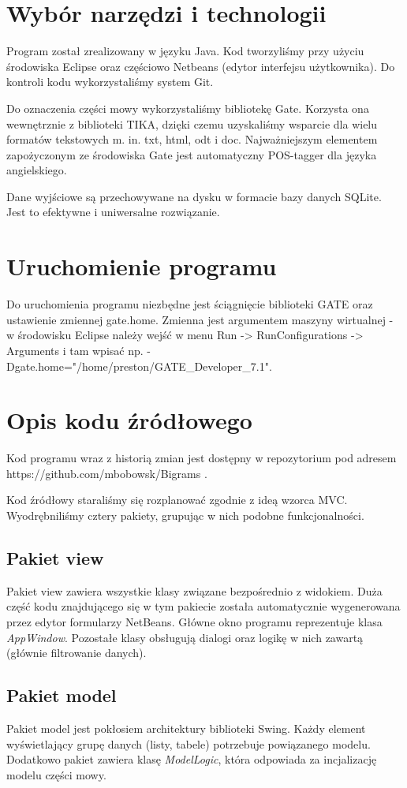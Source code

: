 \documentclass[11pt]{article}
\begin{document}
\section{Wybór narzędzi i technologii}
Program został zrealizowany w języku Java.
Kod tworzyliśmy przy użyciu środowiska Eclipse oraz częściowo Netbeans (edytor interfejsu użytkownika).
Do kontroli kodu wykorzystaliśmy system Git.

Do oznaczenia części mowy wykorzystaliśmy bibliotekę Gate.
Korzysta ona wewnętrznie z biblioteki TIKA, dzięki czemu uzyskaliśmy wsparcie dla wielu formatów tekstowych m. in. txt, html, odt i doc.
Najważniejszym elementem zapożyczonym ze środowiska Gate jest automatyczny POS-tagger dla języka angielskiego.

Dane wyjściowe są przechowywane na dysku w formacie bazy danych SQLite.
Jest to efektywne i uniwersalne rozwiązanie.

\section{Uruchomienie programu}
Do uruchomienia programu niezbędne jest ściągnięcie biblioteki GATE oraz ustawienie zmiennej gate.home.
Zmienna jest argumentem maszyny wirtualnej - w środowisku Eclipse należy wejść w menu Run -> RunConfigurations -> Arguments i tam wpisać np. -Dgate.home="/home/preston/GATE\_Developer\_7.1".

\section{Opis kodu źródłowego}
Kod programu wraz z historią zmian jest dostępny w repozytorium pod adresem https://github.com/mbobowsk/Bigrams .

Kod źródłowy staraliśmy się rozplanować zgodnie z ideą wzorca MVC.
Wyodrębniliśmy cztery pakiety, grupując w nich podobne funkcjonalności.
\subsection{Pakiet view}
Pakiet view zawiera wszystkie klasy związane bezpośrednio z widokiem.
Duża część kodu znajdującego się w tym pakiecie została automatycznie wygenerowana przez edytor formularzy NetBeans.
Główne okno programu reprezentuje klasa \emph{AppWindow}.
Pozostałe klasy obsługują dialogi oraz logikę w nich zawartą (głównie filtrowanie danych).

\subsection{Pakiet model}
Pakiet model jest pokłosiem architektury biblioteki Swing.
Każdy element wyświetlający grupę danych (listy, tabele) potrzebuje powiązanego modelu.
Dodatkowo pakiet zawiera klasę \emph{ModelLogic}, która odpowiada za incjalizację modelu części mowy.
\end{document}
